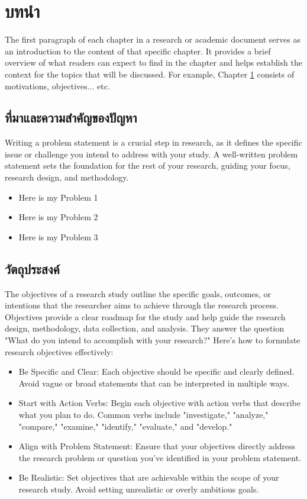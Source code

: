 \chapter{บทนำ}
\label{Ch:Introduction}
The first paragraph of each chapter in a research or academic document serves as an introduction to the content of that specific chapter. It provides a brief overview of what readers can expect to find in the chapter and helps establish the context for the topics that will be discussed. For example, Chapter \ref{Ch:Introduction} consists of motivations, objectives... etc.

\section{ที่มาและความสำคัญของปัญหา}
\label{Sec:ProblemStatement}

Writing a problem statement is a crucial step in research, as it defines the specific issue or challenge you intend to address with your study. A well-written problem statement sets the foundation for the rest of your research, guiding your focus, research design, and methodology. 

\begin{itemize}
  \item  Here is my Problem 1
  \item  Here is my Problem 2
  \item  Here is my Problem 3
\end{itemize}

\section{วัตถุประสงค์}
\label{Sec:Objective}
The objectives of a research study outline the specific goals, outcomes, or intentions that the researcher aims to achieve through the research process. Objectives provide a clear roadmap for the study and help guide the research design, methodology, data collection, and analysis. They answer the question "What do you intend to accomplish with your research?" Here's how to formulate research objectives effectively:

\begin{itemize}
    \item Be Specific and Clear:
    Each objective should be specific and clearly defined. Avoid vague or broad statements that can be interpreted in multiple ways.

    \item Start with Action Verbs:
    Begin each objective with action verbs that describe what you plan to do. Common verbs include "investigate," "analyze," "compare," "examine," "identify," "evaluate," and "develop."

    \item Align with Problem Statement:
    Ensure that your objectives directly address the research problem or question you've identified in your problem statement.

    \item Be Realistic:
    Set objectives that are achievable within the scope of your research study. Avoid setting unrealistic or overly ambitious goals. 
\end{itemize}

